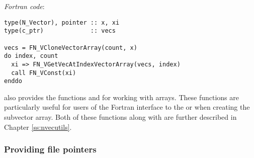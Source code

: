 \noindent \emph{Fortran code}:
\begin{verbatim}
type(N_Vector), pointer :: x, xi
type(c_ptr)             :: vecs

vecs = FN_VCloneVectorArray(count, x)
do index, count
  xi => FN_VGetVecAtIndexVectorArray(vecs, index)
  call FN_VConst(xi)
enddo
\end{verbatim}

{\sundials} also provides the functions  and
 for working with  arrays. These functions
are particularly useful for users of the Fortran interface to the
{\nvecmanyvector} or {\nvecmpimanyvector} when creating the subvector array.
Both of these functions along with  are further
described in Chapter \ref{ss:nvecutils}.

\subsubsection{Providing file pointers}

